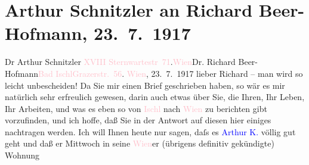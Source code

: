 

               \section[Arthur Schnitzler an Richard Beer-Hofmann, 23. 7. 1917]{ Arthur Schnitzler an Richard Beer-Hofmann, 23. 7. 1917}\nopagebreak{}\rehead{ }\normalsize\beginnumbering{} \toendnotes[C]{\smallbreak\pagebreak[2]} 
\toendnotes[C]{\smallbreak}\pstart{}{\pb}Dr Arthur Schnitzler \textcolor{pink}{XVIII Sternwartestr 71}{}\ledrightnote{\textcolor{pink}{Sternwartestraße}}.\pend{}\pstart{}\textcolor{pink}{Wien}{}\ledrightnote{\textcolor{pink}{Wien}}\pend{}{\bigskip}\pstart{}{\pb}Dr. Richard Beer-Hofmann\pend{}\pstart{}\textcolor{pink}{Bad Ischl}{}\ledrightnote{\textcolor{pink}{Bad Ischl}}\pend{}\pstart{}\textcolor{pink}{Grazerstr. 56}{}\ledrightnote{\textcolor{pink}{Grazer Straße}}.\pend{}{\bigskip}\pstart
           \raggedleft{}{\pb}\textcolor{pink}{Wien}{}\ledrightnote{\textcolor{pink}{Wien}}, 23. 7. 1917\pend
           \pstart
           lieber Richard – man wird so leicht unbescheiden! Da Sie mir einen
               Brief geschrieben haben, so wär es mir natürlich sehr erfreulich gewesen, darin auch
               etwas über Sie, die Ihren, Ihr Leben, Ihr Arbeiten, und was es eben so von \textcolor{pink}{Ischl}{}\ledrightnote{\textcolor{pink}{Bad Ischl}} nach \textcolor{pink}{Wien}{}\ledrightnote{\textcolor{pink}{Wien}} zu
               berichten gibt vorzufinden, und ich hoffe, daß Sie in der Antwort auf diesen hier
               einiges nachtragen werden. Ich will Ihnen heute nur sagen, daſs es \textcolor{blue}{Arthur K.}{}\ledrightnote{\textcolor{blue}{Arthur Kaufmann}} völlig gut geht und daß er Mittwoch in seine \textcolor{pink}{Wien}{}\ledrightnote{\textcolor{pink}{Wien}}er (übrigens definitiv gekündigte) Wohnung
